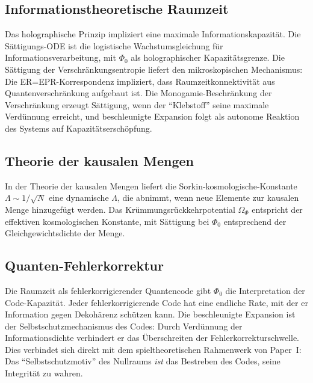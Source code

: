 \documentclass[11pt,a4paper]{article}
\begin{document}
\subsection{Informationstheoretische Raumzeit}
Das holographische Prinzip \cite{Bousso2002} impliziert eine maximale Informationskapazit\"at. Die S\"attigungs-ODE ist die logistische Wachstumsgleichung f\"ur Informationsverarbeitung, mit $\Phi_0$ als holographischer Kapazit\"atsgrenze. Die S\"attigung der Verschr\"ankungsentropie \cite{VanRaamsdonk2010} liefert den mikroskopischen Mechanismus: Die ER=EPR-Korrespondenz \cite{Maldacena2013} impliziert, dass Raumzeitkonnektivit\"at aus Quantenverschr\"ankung aufgebaut ist. Die Monogamie-Beschr\"ankung der Verschr\"ankung erzeugt S\"attigung, wenn der "`Klebstoff"' seine maximale Verd\"unnung erreicht, und beschleunigte Expansion folgt als autonome Reaktion des Systems auf Kapazit\"atsersch\"opfung.

\subsection{Theorie der kausalen Mengen}
In der Theorie der kausalen Mengen \cite{Bombelli1987, Sorkin2003} liefert die Sorkin-kosmologische-Konstante \cite{Sorkin1991} $\Lambda \sim 1/\sqrt{N}$ eine dynamische $\Lambda$, die abnimmt, wenn neue Elemente zur kausalen Menge hinzugef\"ugt werden. Das Kr\"ummungsr\"uckkehrpotential $\Omega_\Phi$ entspricht der effektiven kosmologischen Konstante, mit S\"attigung bei $\Phi_0$ entsprechend der Gleichgewichtsdichte der Menge.

\subsection{Quanten-Fehlerkorrektur}
Die Raumzeit als fehlerkorrigierender Quantencode \cite{Almheiri2015, Pastawski2015} gibt $\Phi_0$ die Interpretation der Code-Kapazit\"at. Jeder fehlerkorrigierende Code hat eine endliche Rate, mit der er Information gegen Dekoh\"arenz sch\"utzen kann. Die beschleunigte Expansion ist der Selbstschutzmechanismus des Codes: Durch Verd\"unnung der Informationsdichte verhindert er das \"Uberschreiten der Fehlerkorrekturschwelle. Dies verbindet sich direkt mit dem spieltheoretischen Rahmenwerk von Paper~I: Das "`Selbstschutzmotiv"' des Nullraums \textit{ist} das Bestreben des Codes, seine Integrit\"at zu wahren.
\end{document}

